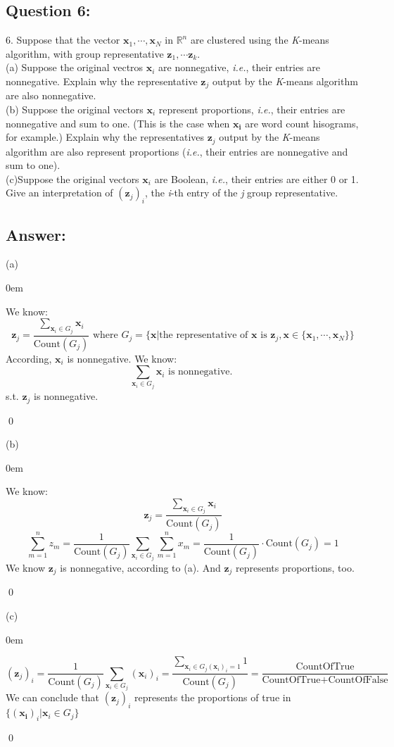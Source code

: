 \documentclass{article}
\newcommand{\R}{\mathbb{R}}
\renewenvironment{proof}{\begin{addmargin}[1em]{0em}\begin{newproof}}
{\end{newproof}\end{addmargin}\qed}
\begin{document}
\subsection*{Question 6:}
6. Suppose that the vector \(\bm{x}_1, \cdots, \bm{x}_N\) in \(\R^n\) are clustered using the \textit{K}-means algorithm, with group representative \(\bm{z}_1, \cdots \bm{z}_k\). \\
(a) Suppose the original vectros \(\bm{x}_i\) are nonnegative, \textit{i.e.}, their entries are nonnegative. Explain why the representative \(\bm{z}_j\) output by the \textit{K}-means algorithm are also nonnegative. \\
(b) Suppose the original vectors \(\bm{x}_i\) represent proportions, \textit{i.e.}, their entries are nonnegative and sum to one. (This is the case when \(\bm{x_i}\) are word count hisograms, for example.) Explain why the representatives \(\bm{z}_j\) output by the \textit{K}-means algorithm are also represent proportions (\textit{i.e.}, their entries are nonnegative and sum to one). \\
(c)Suppose the original vectors \(\bm{x}_i\) are Boolean, \textit{i.e.}, their entries are either 0 or 1. Give an interpretation of \((\bm{z}_j)_i\), the \textit{i}-th entry of the \textit{j} group representative.
\subsection*{Answer:}
(a)
\begin{proof}
    We know:
    \[
        \bm{z}_j = \frac {\sum_{\bm{x}_i \in G_j}\bm{x}_i} {\text{Count}(G_j)} \text{ where } G_j = \{\bm{x} | \text{the representative of }\bm{x} \text{ is }\bm{z}_j, \bm{x} \in \{\bm{x}_1, \cdots, \bm{x}_N\}\}
    \]
    According, \(\bm{x}_i\) is nonnegative. We know:
    \[
        \sum_{\bm{x}_i \in G_j}\bm{x}_i \text{ is nonnegative. }
    \]
    s.t.    \(\bm{z}_j\) is nonnegative.
\end{proof}

(b)
\begin{proof}
    We know:
    \[
        \bm{z}_j = \frac {\sum_{\bm{x}_i \in G_j}\bm{x}_i}  {\text{Count}(G_j)}
    \]
    \[
        \sum_{m = 1}^nz_m = \frac {1}{\text{Count}(G_j)} \sum_{\bm{x}_i \in G_j}\sum_{m=1}^nx_m = \frac{1}{\text{Count}(G_j)} \cdot \text{Count}(G_j) = 1
    \]
    We know \(\bm{z}_j\) is nonnegative, according to (a). And \(\bm{z}_j\) represents proportions, too.
    
\end{proof}

(c)
\begin{proof}
    \[
        (\bm{z}_j)_i = \frac {1}{\text{Count}(G_j)} \sum_{\bm{x}_i \in G_j} (\bm{x}_i)_i = \frac{\sum_{\bm{x}_i \in G_j (\bm{x}_i)_i = 1}1}{\text{Count}(G_j)} = \frac{\text{CountOfTrue}}{\text{CountOfTrue} + \text{CountOfFalse}}
    \]
    We can conclude that \((\bm{z}_j)_i\) represents the proportions of true in \(\{(\bm{x_i})_i| \bm{x}_i \in G_j\}\)
    
\end{proof}
\end{document}
